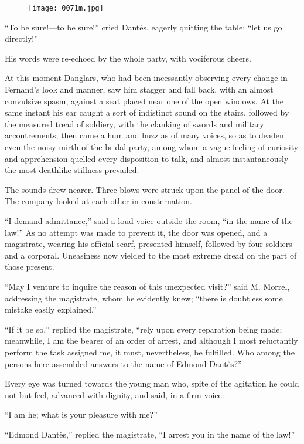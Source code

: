 \begin{figure}[ht]
\texttt{[image: 0071m.jpg]}
\end{figure}

“To be sure!—to be sure!” cried Dantès, eagerly quitting the table;
“let us go directly!”

His words were re-echoed by the whole party, with vociferous cheers.

At this moment Danglars, who had been incessantly observing every
change in Fernand’s look and manner, saw him stagger and fall back,
with an almost convulsive spasm, against a seat placed near one of the
open windows. At the same instant his ear caught a sort of indistinct
sound on the stairs, followed by the measured tread of soldiery, with
the clanking of swords and military accoutrements; then came a hum and
buzz as of many voices, so as to deaden even the noisy mirth of the
bridal party, among whom a vague feeling of curiosity and apprehension
quelled every disposition to talk, and almost instantaneously the most
deathlike stillness prevailed.

The sounds drew nearer. Three blows were struck upon the panel of the
door. The company looked at each other in consternation.

“I demand admittance,” said a loud voice outside the room, “in the name
of the law!” As no attempt was made to prevent it, the door was opened,
and a magistrate, wearing his official scarf, presented himself,
followed by four soldiers and a corporal. Uneasiness now yielded to the
most extreme dread on the part of those present.

“May I venture to inquire the reason of this unexpected visit?” said M.
Morrel, addressing the magistrate, whom he evidently knew; “there is
doubtless some mistake easily explained.”

“If it be so,” replied the magistrate, “rely upon every reparation
being made; meanwhile, I am the bearer of an order of arrest, and
although I most reluctantly perform the task assigned me, it must,
nevertheless, be fulfilled. Who among the persons here assembled
answers to the name of Edmond Dantès?”

Every eye was turned towards the young man who, spite of the agitation
he could not but feel, advanced with dignity, and said, in a firm
voice:

“I am he; what is your pleasure with me?”

“Edmond Dantès,” replied the magistrate, “I arrest you in the name of
the law!”

